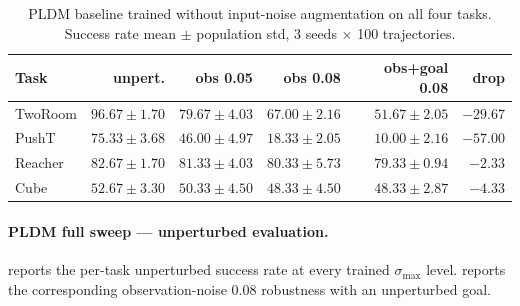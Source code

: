 \documentclass[10pt]{article}
\newcommand{\stdmax}{\ensuremath{\sigma_{\max}}}
\begin{document}
\begin{table}[H]
\centering
\caption{PLDM baseline trained without input-noise augmentation on all four tasks. Success rate mean $\pm$ population std, 3 seeds $\times$ 100 trajectories.}
\label{tab:pldm-base-cliff}
\small
\begin{tabular}{lrrrrr}
\toprule
Task & unpert. & obs 0.05 & obs 0.08 & obs+goal 0.08 & drop \\
\midrule
TwoRoom & $96.67 \pm 1.70$ & $79.67 \pm 4.03$ & $67.00 \pm 2.16$ & $51.67 \pm 2.05$ & $-29.67$ \\
PushT & $75.33 \pm 3.68$ & $46.00 \pm 4.97$ & $18.33 \pm 2.05$ & $10.00 \pm 2.16$ & $-57.00$ \\
Reacher & $82.67 \pm 1.70$ & $81.33 \pm 4.03$ & $80.33 \pm 5.73$ & $79.33 \pm 0.94$ & $-2.33$ \\
Cube & $52.67 \pm 3.30$ & $50.33 \pm 4.50$ & $48.33 \pm 4.50$ & $48.33 \pm 2.87$ & $-4.33$ \\
\bottomrule
\end{tabular}
\end{table}

\paragraph{PLDM full sweep --- unperturbed evaluation.}  reports the per-task unperturbed success rate at every trained \stdmax{} level.  reports the corresponding observation-noise 0.08 robustness with an unperturbed goal.
\end{document}
